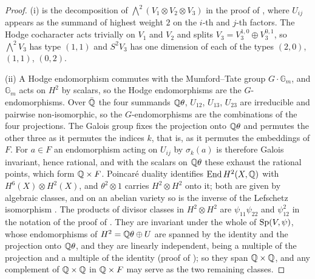 \begin{proof}
(i) is the decomposition of $\bigwedge^{2}(V_{1}\otimes V_{2}\otimes V_{3})$
in the proof of , where $U_{ij}$ appears as the
summand of highest weight $2$ on the $i$-th and $j$-th factors. The Hodge
cocharacter acts trivially on $V_{1}$ and $V_{2}$ and splits
$V_{3}=V_{3}^{1,0}\oplus V_{3}^{0,1}$, so $\bigwedge^{2}V_{3}$ has type
$(1,1)$ and $S^{2}V_{3}$ has one dimension of each of the types $(2,0)$,
$(1,1)$, $(0,2)$.

(ii) A Hodge endomorphism commutes with the Mumford--Tate group
$G\cdot\mathbb{G}_{m}$, and $\mathbb{G}_{m}$ acts on $H^{2}$ by scalars, so
the Hodge endomorphisms are the $G$-endomorphisms. Over $\bar{\mathbb{Q}}$ the four
summands $\mathbb{Q}\theta$, $U_{12}$, $U_{13}$, $U_{23}$ are irreducible and
pairwise non-isomorphic, so the $G$-endomorphisms are the combinations of the
four projections. The Galois group fixes the projection onto $\mathbb{Q}\theta$ and
permutes the other three as it permutes the indices $k$, that is, as it
permutes the embeddings of $F$. For $a\in F$ an endomorphism acting on
$U_{ij}$ by $\sigma_{k}(a)$ is therefore Galois invariant, hence rational, and
with the scalars on $\mathbb{Q}\theta$ these exhaust the rational points, which form
$\mathbb{Q}\times F$. Poincar\'e duality identifies $\operatorname{End} H^{2}(X,\mathbb{Q})$ with
$H^{6}(X)\otimes H^{2}(X)$, and $\theta^{2}\otimes1$ carries
$H^{2}\otimes H^{2}$ onto it; both are given by algebraic classes, and on an
abelian variety so is the inverse of the Lefschetz isomorphism
\cite[\S2]{Kle68}. The products of divisor classes in $H^{2}\otimes H^{2}$
are $\psi_{11}\psi_{22}$ and $\psi_{12}^{2}$ in the notation of the proof of
. They are invariant under the whole of
$\operatorname{Sp}(V,\psi)$, whose endomorphisms of $H^{2}=\mathbb{Q}\theta\oplus U$ are spanned
by the identity and the projection onto $\mathbb{Q}\theta$, and they are linearly
independent, being a multiple of the projection and a multiple of the
identity (proof of ); so they span $\mathbb{Q}\times\mathbb{Q}$, and any complement of
$\mathbb{Q}\times\mathbb{Q}$ in $\mathbb{Q}\times F$ may serve as the two remaining classes.


\end{proof}
